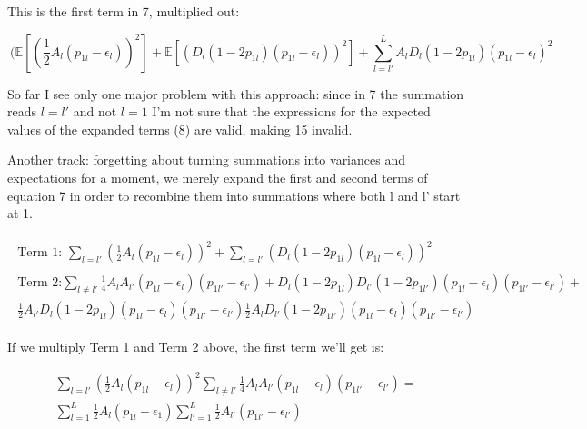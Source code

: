 \documentclass[a4paper,10pt]{article}
\begin{document}
This is the first term in 7, multiplied out:

\begin{equation}
  \ ( \mathbb{E}[(\frac{1}{2}A_l (p_{1l} - \epsilon_l))^2 ] +
  \mathbb{E}[(D_l(1-2p_{1l})(p_{1l}-\epsilon _l))^2] + \sum_{l=l'}^L A_lD_l(1-2p_{1l})(p_{1l}-\epsilon_l)^2
\end{equation}


So far I see only one major problem with this approach: since in 7 the
summation reads $l = l'$ and not $l = 1$ I'm not sure that the
expressions for the expected values of the expanded terms (8) are
valid, making 15 invalid. 

\vspace{5mm}

Another track: forgetting about turning summations into variances and
expectations for a moment, we merely expand the first and second terms
of equation 7 in order to recombine them into summations where both l
and l' start at 1. 

\begin{align}
  \begin{split}
 \text{Term 1: } \sum_{l=l'} (\frac{1}{2}A_l(p_{1l}-\epsilon_l))^2 +
  \sum_{l = l'}(D_l(1-2p_{1l})(p_{1l}-\epsilon_l))^2
  \end{split}
  \\
  \begin{split}
\text{Term 2:} \sum_{l \neq l'}
\frac{1}{4}A_lA_{l'}(p_{1l}-\epsilon_{l})(p_{1l'}-\epsilon_{l'})+D_l(1-2p_{1l})D_{l'}(1-2p_{1l'})(p_{1l}-\epsilon_{l})(p_{1l'}-\epsilon_{l'})+\\
\frac{1}{2}A_{l'}D_{l}(1-2p_{1l})(p_{1l}-\epsilon_{l})(p_{1l'}-\epsilon_{l'})\frac{1}{2}A_{l}D_{l'}(1-2p_{1l'})(p_{1l}-\epsilon_{l})(p_{1l'}-\epsilon_{l'})
\end{split}
\end{align}

If we multiply Term 1 and Term 2 above, the first term we'll get is:

\begin{equation}
  \begin{split}
  \sum_{l=l'}( \frac{1}{2}A_l(p_{1l}-\epsilon_{l}))^2
  \sum_{l \neq l'}\frac{1}{4}A_lA_{l'}(p_{1l}-\epsilon_{l})(p_{1l'}-\epsilon_{l'})
  = \\
  \sum^L_{l=1}\frac{1}{2}A_l(p_{1l}-\epsilon_{1}) \sum^L_{l'=1}\frac{1}{2}A_{l'}(p_{1l'}-\epsilon_{l'})
\end{split}
\end{equation}
\end{document}
